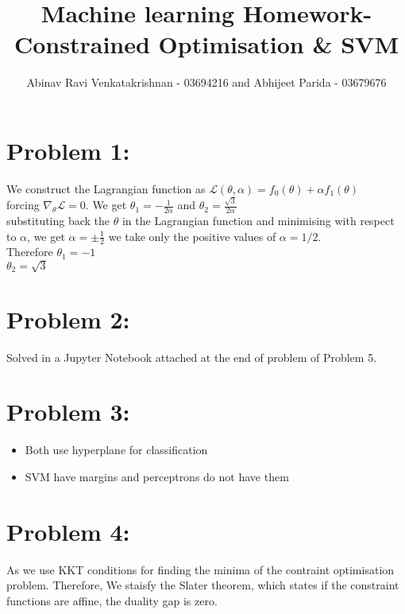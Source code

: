 \documentclass[5pt,a4paper]{article}
\begin{document}
	\title{Machine learning Homework- Constrained Optimisation \& SVM }
	\author{Abinav Ravi Venkatakrishnan - 03694216 and Abhijeet Parida - 03679676}
	\maketitle
	\section*{Problem 1:}
	We construct the Lagrangian function as
	$\mathcal{L}(\theta, \alpha)=f_0(\theta)+\alpha f_1(\theta)$\\
	forcing $\nabla_\theta \mathcal{L}=0$. We get $\theta_1=-\frac{1}{2\alpha}$ and $\theta_2=\frac{\sqrt{3}}{2\alpha}$\\
	substituting back the $\theta$ in the Lagrangian function and minimising with respect to $\alpha$, we get $\alpha=\pm \frac{1}{2}$ we take only the positive values of $\alpha=1/2$.\\
	Therefore $\theta_1=-1$\\
	$\theta_2=\sqrt{3}$
	
	\section*{Problem 2:}
	Solved in a Jupyter Notebook attached at the end of problem of Problem 5.
	
	\section*{Problem 3:}
	\begin{itemize}
		\item Both use hyperplane for classification
		\item SVM have margins and perceptrons do not have them
	\end{itemize}
	
	\section*{Problem 4:}
	As we use KKT conditions for finding the minima of the contraint optimisation problem. Therefore, We staisfy the Slater theorem, which states  if the constraint 	functions are affine, the duality gap is zero.
\end{document}
